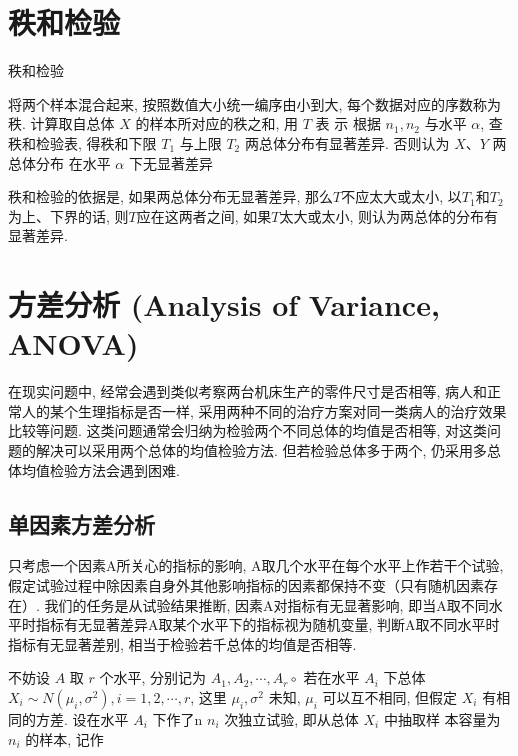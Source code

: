 \section{秩和检验}

\begin{algorithm}\caption{秩和检验}
将两个样本混合起来, 按照数值大小统一编序由小到大, 每个数据对应的序数称为秩. \;
计算取自总体 \( X \) 的样本所对应的秩之和, 用 \( {T} \) 表 示\;
根据 \( {n}_{1}, {n}_{2} \) 与水平 \( \alpha \), 查秩和检验表, 得秩和下限 \( {T}_{1} \) 与上限 \( {T}_{{2}} \) \;
两总体分布有显著差异. 否则认为 \( X 、 Y \) 两总体分布
在水平 \( \alpha \) 下无显著差异\;
\end{algorithm}

秩和检验的依据是, 如果两总体分布无显著差异, 那么$T$不应太大或太小, 以$T_1$和$T_2$为上、下界的话, 则$T$应在这两者之间, 如果$T$太大或太小, 则认为两总体的分布有显著差异. 

\section{方差分析 (Analysis of Variance, ANOVA)}

在现实问题中, 经常会遇到类似考察两台机床生产的零件尺寸是否相等, 病人和正常人的某个生理指标是否一样, 采用两种不同的治疗方案对同一类病人的治疗效果比较等问题. 这类问题通常会归纳为检验两个不同总体的均值是否相等, 对这类问题的解决可以采用两个总体的均值检验方法. 但若检验总体多于两个, 仍采用多总体均值检验方法会遇到困难. 

\subsection{单因素方差分析}

只考虑一个因素A所关心的指标的影响, A取几个水平在每个水平上作若干个试验, 假定试验过程中除因素自身外其他影响指标的因素都保持不变（只有随机因素存在）. 我们的任务是从试验结果推断, 因素A对指标有无显著影响, 即当A取不同水平时指标有无显著差异A取某个水平下的指标视为随机变量, 判断A取不同水平时指标有无显著差别, 相当于检验若千总体的均值是否相等. 

不妨设 $A$ 取 $r$ 个水平, 分别记为 $A_{1}, A_{2}, \cdots, A_{r} \circ$ 若在水平 $A_{i}$ 下总体 $X_{i} \sim N\left(\mu_{i}, \sigma^{2}\right), i=1,2, \cdots, r$, 这里 $\mu_{i}, \sigma^{2}$ 未知, $\mu_{i}$ 可以互不相同, 但假定 $X_{i}$ 有相同的方差.  设在水平 $A_{i}$ 下作了n $n_{i}$ 次独立试验, 即从总体 $X_{i}$ 中抽取样 本容量为 $n_{i}$ 的样本, 记作

